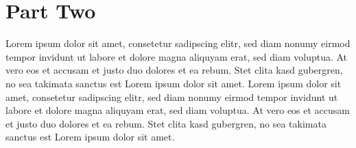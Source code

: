 \documentclass{beamer}
\begin{document}
\section{Part Two}
  \begin{frame}{Lorem ipsum}
   dolor sit amet, consetetur sadipscing elitr, sed diam nonumy eirmod tempor invidunt ut labore et dolore magna aliquyam erat, sed diam voluptua. At vero eos et accusam et justo duo dolores et ea rebum. Stet clita kasd gubergren, no sea takimata sanctus est Lorem ipsum dolor sit amet. Lorem ipsum dolor sit amet, consetetur sadipscing elitr, sed diam nonumy eirmod tempor invidunt ut labore et dolore magna aliquyam erat, sed diam voluptua. At vero eos et accusam et justo duo dolores et ea rebum. Stet clita kasd gubergren, no sea takimata sanctus est Lorem ipsum dolor sit amet.
  \end{frame}
\end{document}
